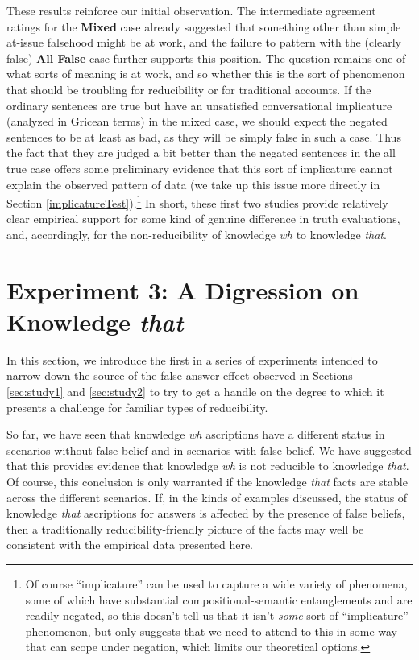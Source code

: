 \documentclass[a4paper]{article}
\begin{document}
These results reinforce our initial observation. The intermediate agreement ratings for the \textbf{Mixed} case already suggested that something other than simple at-issue falsehood might be at work, and the failure to pattern with the (clearly false) \textbf{All False} case further supports this position. The question remains one of what sorts of meaning is at work, and so whether this is the sort of phenomenon that should be troubling for reducibility or for traditional accounts. If the ordinary sentences are true but have an unsatisfied conversational implicature (analyzed in Gricean terms) in the mixed case, we should expect the negated sentences to be at least as bad, as they will be simply false in such a case. Thus the fact that they are judged a bit better than the negated sentences in the all true case offers some preliminary evidence that this sort of implicature cannot explain the observed pattern of data (we take up this issue more directly in Section \ref{implicatureTest}).\footnote{Of course ``implicature'' can be used to capture a wide variety of phenomena, some of which have substantial compositional-semantic entanglements and are readily negated, so this doesn't tell us that it isn't \emph{some} sort of ``implicature'' phenomenon, but only suggests that we need to attend to this in some way that can scope under negation, which limits our theoretical options.} In short, these first two studies provide relatively clear empirical support for some kind of genuine difference in truth evaluations, and, accordingly, for the non-reducibility of knowledge \textit{wh} to knowledge \textit{that}.


\section{Experiment 3: A Digression on Knowledge \textit{that}}\label{knowledgethat}

In this section, we introduce the first in a series of experiments intended to narrow down the source of the false-answer effect observed in Sections \ref{sec:study1} and \ref{sec:study2} to try to get a handle on the degree to which it presents a challenge for familiar types of reducibility.

So far, we have seen that knowledge \textit{wh} ascriptions have a different status in scenarios without false belief and in scenarios with false belief. We have suggested that this provides evidence that knowledge \textit{wh} is not reducible to knowledge \textit{that}. Of course, this conclusion is only warranted if the knowledge \textit{that} facts are stable across the different scenarios. If, in the kinds of examples discussed, the status of knowledge \textit{that} ascriptions for answers is affected by the presence of false beliefs, then a traditionally reducibility-friendly picture of the facts may well be consistent with the empirical data presented here.
\end{document}
